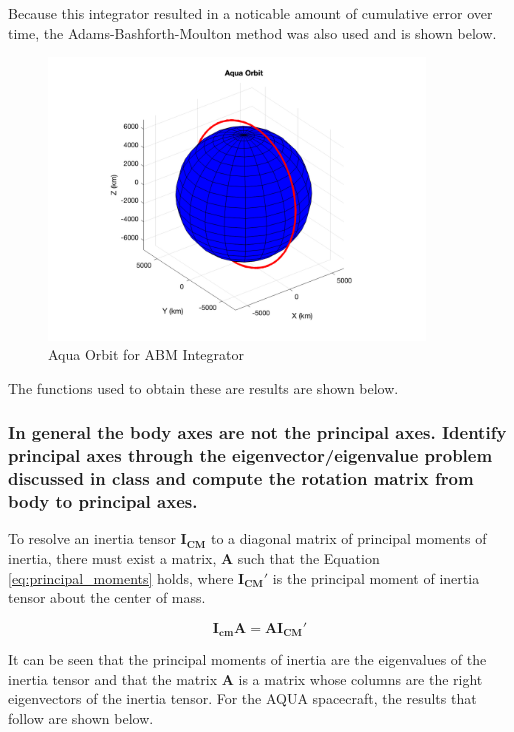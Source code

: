Because this integrator resulted in a noticable amount of cumulative error over time, the Adams-Bashforth-Moulton method was also used and is shown below.

\begin{figure}[H]
    \centering
    \includegraphics[width = 10cm]{Images/ode23_orbit.png}
    \caption{Aqua Orbit for ABM Integrator}
    \label{fig:numerical_orbit_rk}
\end{figure}

The functions used to obtain these are results are shown below.





\subsubsection{In general the body axes are not the principal axes. Identify principal axes through the eigenvector/eigenvalue problem discussed in class and compute the rotation matrix from body to principal axes.} \label{sec:principal_inertia_def_and_calc}

To resolve an inertia tensor $\boldsymbol{I_{CM}}$ to a diagonal matrix of principal moments of inertia, there must exist a matrix, $\boldsymbol{A}$ such that the Equation \ref{eq:principal_moments} holds, where $\boldsymbol{I_{CM}'}$ is the principal moment of inertia tensor about the center of mass.

\begin{equation} \label{eq:principal_moments}
    \boldsymbol{I_{cm} A} = \boldsymbol{A I_{CM}'} 
\end{equation}

It can be seen that the principal moments of inertia are the eigenvalues of the inertia tensor and that the matrix $\boldsymbol{A}$ is a matrix whose columns are the right eigenvectors of the inertia tensor. For the AQUA spacecraft, the results that follow are shown below.

